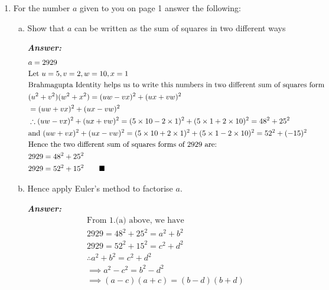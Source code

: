 \documentclass[11pt,a4paper,fleqn]{article}
\newcommand{\qedn}{\tag*{$\blacksquare$}}
\begin{document}
	\begin{enumerate}[1.]
		\item For the number $a$ given to you on page 1 answer the following:
		\begin{enumerate}[a.]
			\item Show that $a$ can be written as the sum of squares in two different ways
			\bigskip
			\begin{flushleft}
				\textbf{\textit{Answer:}}
                \begin{align*}
                    &a = 2929 \\
                    &\text{Let } u = 5, v = 2, w = 10, x = 1\\
                    &\text{Brahmagupta Identity helps us to write this numbers in two different sum of squares form}\\
                    &(u^2 + v^2)(w^2 + x^2) = (uw - vx)^2 + (ux + vw)^2\\
                    &                       = (uw + vx)^2 + (ux - vw)^2\\
                    &\therefore (uw - vx)^2 + (ux + vw)^2 = (5 \times 10 - 2 \times 1)^2 + (5 \times 1 + 2\times 10)^2 = 48^2 + 25^2 \\
                    &\text{and }  (uw + vx)^2 + (ux - vw)^2 = (5 \times 10 + 2 \times 1)^2 + (5 \times 1 - 2 \times 10)^2 = 52^2 + (-15)^2\\
                    &\text{Hence the two different sum of squares forms of 2929 are: }\\
                    &2929 = 48^2 + 25^2\\
                    &2929 = 52^2 + 15^2  \hfill\qedn
                \end{align*}
			\end{flushleft}
			\item Hence apply Euler’s method to factorise $a$.
			\begin{flushleft}
				\textbf{\textit{Answer:}}
                \begin{align*}
                    &\text{From 1.(a) above, we have }\\
                    &2929 = 48^2 + 25^2 = a^2 + b^2\\
                    &2929 = 52^2 + 15^2 = c^2 + d^2\\
                    &\therefore a^2 + b^2 = c^2 + d^2\\
                    &\implies a^2 - c^2 = b^2 - d^2\\
                    &\implies (a - c)(a + c) = (b - d)(b + d)\\

\end{align*}
\end{flushleft}
\end{enumerate}
\end{enumerate}
\end{document}
